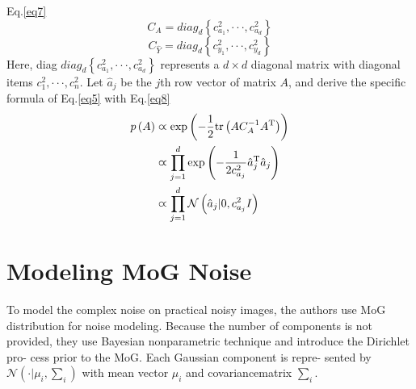 \documentclass[10pt,twocolumn,letterpaper]{article}
\begin{document}
Eq.\ref{eq7}
\begin{equation}
C_A = diag_d \left\lbrace c^2_{a_1},\cdot\cdot\cdot,c^2_{a_d}\right\rbrace 
\label{eq6}
\end{equation}
\begin{equation}
C_{\hat{Y}} = diag_d \left\lbrace c^2_{y_1},\cdot\cdot\cdot,c^2_{y_d}\right\rbrace 
\label{eq7}
\end{equation}
Here, diag $diag_d \left\lbrace c^2_{a_1},\cdot\cdot\cdot,c^2_{a_d}\right\rbrace$ represents a $d \times d$ diagonal matrix
with diagonal items $c_1^2,\cdot\cdot\cdot,c^2_n$. Let $\hat{a}_j$ be the $j$th row vector of matrix $A$, and derive the specific formula of Eq.\ref{eq5} 
with Eq.\ref{eq8}
\begin{equation}
\begin{aligned}
p\left(A\right) &\varpropto {\rm exp}\left(-\frac{1}{2}{\rm tr}\left(AC_A^{-1}A^\mathrm{T}\right)\right) \\
& \varpropto \prod_{j=1}^d {\rm exp}\left(-\frac{1}{2c^2_{a_j}}\hat{a}_j^\mathrm{T}\hat{a}_j\right)\\
& \varpropto \prod_{j=1}^{d} \mathcal{N}\left(\hat{a}_j|0,c^2_{a_j}I\right)
\end{aligned}
\label{eq8}
\end{equation}
\section{Modeling MoG Noise}
To model the complex noise on practical noisy images,
the authors use MoG distribution for noise modeling. Because the
number of components is not provided, they use Bayesian
nonparametric technique and introduce the Dirichlet pro-
cess prior to the MoG. Each Gaussian component is repre-
sented by $\mathcal{N}\left(\cdot|\mu_i,\sum_{i}\right)$ with 
mean vector $\mu_i$ and covariancematrix $\sum_{i}$.

{\small
	
	
}
\end{document}
